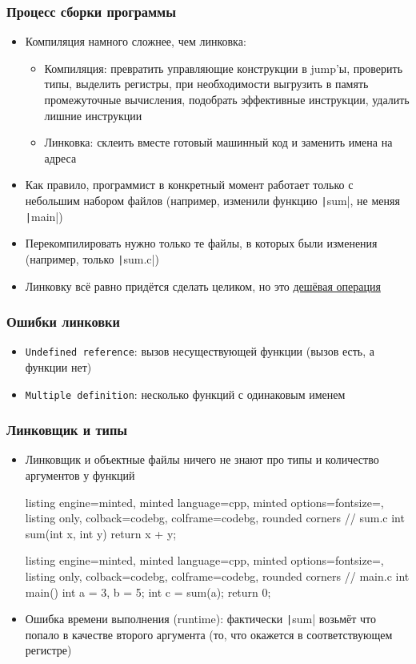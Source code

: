\documentclass[10pt]{beamer}
\begin{document}
\begin{frame}[fragile]
\frametitle{Процесс сборки программы}
\begin{itemize}
\item Компиляция намного сложнее, чем линковка:
\pause
\begin{itemize}
\item Компиляция: превратить управляющие конструкции в jump'ы, проверить типы, выделить регистры, при необходимости выгрузить в память промежуточные вычисления, подобрать эффективные инструкции, удалить лишние инструкции
\pause
\item Линковка: склеить вместе готовый машинный код и заменить имена на адреса
\end{itemize}
\pause
\item Как правило, программист в конкретный момент работает только с небольшим набором файлов (например, изменили функцию \texttt|sum|, не меняя \texttt|main|)
\pause
\item Перекомпилировать нужно только те файлы, в которых были изменения (например, только \texttt|sum.c|)
\pause
\item Линковку всё равно придётся сделать целиком, но это \underline{дешёвая операция}
\end{itemize}
\end{frame}

\begin{frame}[fragile]
\frametitle{Ошибки линковки}
\begin{itemize}
\item \texttt{Undefined reference}: вызов несуществующей функции (вызов есть, а функции нет)
\item \texttt{Multiple definition}: несколько функций с одинаковым именем
\end{itemize}
\end{frame}

\begin{frame}[fragile]
\frametitle{Линковщик и типы}
\begin{itemize}
\item Линковщик и объектные файлы ничего не знают про типы и количество аргументов у функций
\pause
{}
\begin{tcblisting}{listing engine=minted, minted language=cpp, minted options={fontsize=\scriptsize}, listing only, colback=codebg, colframe=codebg, rounded corners}
// sum.c
int sum(int x, int y) {
  return x + y;
}
\end{tcblisting}
\begin{tcblisting}{listing engine=minted, minted language=cpp, minted options={fontsize=\scriptsize}, listing only, colback=codebg, colframe=codebg, rounded corners}
// main.c
int main() {
  int a = 3, b = 5;
  int c = sum(a);
  return 0;
}
\end{tcblisting}
\pause
{}
\item Ошибка времени выполнения (runtime): фактически \texttt|sum| возьмёт что попало в качестве второго аргумента (то, что окажется в соответствующем регистре)
\end{itemize}
\end{frame}
\end{document}
